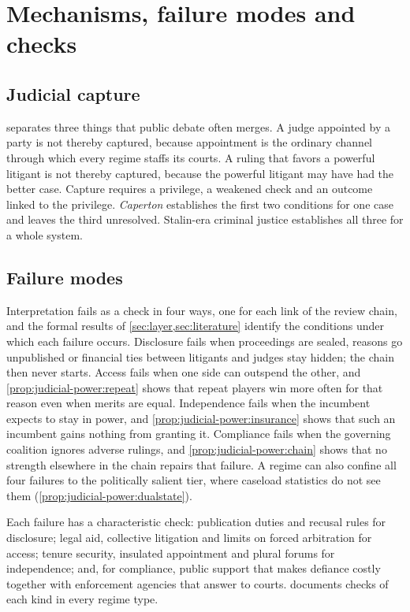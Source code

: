 \documentclass[11pt,letterpaper]{article}
\theoremstyle{definition}
\theoremstyle{remark}
\begin{document}
\section{Mechanisms, failure modes and checks}
\label{sec:mechanisms}

\subsection{Judicial capture}

 separates three things that public debate often merges. A judge appointed by a party is not thereby captured, because appointment is the ordinary channel through which every regime staffs its courts. A ruling that favors a powerful litigant is not thereby captured, because the powerful litigant may have had the better case. Capture requires a privilege, a weakened check and an outcome linked to the privilege. \emph{Caperton} establishes the first two conditions for one case and leaves the third unresolved. Stalin-era criminal justice establishes all three for a whole system.

\subsection{Failure modes}

Interpretation fails as a check in four ways, one for each link of the review chain, and the formal results of \cref{sec:layer,sec:literature} identify the conditions under which each failure occurs. Disclosure fails when proceedings are sealed, reasons go unpublished or financial ties between litigants and judges stay hidden; the chain then never starts. Access fails when one side can outspend the other, and \cref{prop:judicial-power:repeat} shows that repeat players win more often for that reason even when merits are equal. Independence fails when the incumbent expects to stay in power, and \cref{prop:judicial-power:insurance} shows that such an incumbent gains nothing from granting it. Compliance fails when the governing coalition ignores adverse rulings, and \cref{prop:judicial-power:chain} shows that no strength elsewhere in the chain repairs that failure. A regime can also confine all four failures to the politically salient tier, where caseload statistics do not see them (\cref{prop:judicial-power:dualstate}).

Each failure has a characteristic check: publication duties and recusal rules for disclosure; legal aid, collective litigation and limits on forced arbitration for access; tenure security, insulated appointment and plural forums for independence; and, for compliance, public support that makes defiance costly \citep{vanberg2005} together with enforcement agencies that answer to courts.  documents checks of each kind in every regime type.
\end{document}
